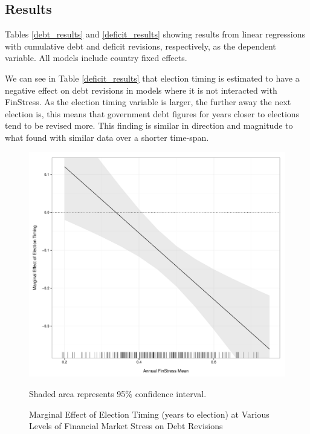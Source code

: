\documentclass[]{article}
\begin{document}




\subsection{Results}

Tables \ref{debt_results} and \ref{deficit_results} showing results from linear regressions with cumulative debt and deficit revisions, respectively, as the dependent variable. All models include country fixed effects.

We can see in Table \ref{deficit_results} that election timing is estimated to have a negative effect on debt revisions in models where it is not interacted with FinStress. As the election timing variable is larger, the further away the next election is, this means that government debt figures for years closer to elections tend to be revised more. This finding is similar in direction and magnitude to what \cite{DeCastro2013} found with similar data over a shorter time-span.

\begin{figure}
    \caption{Marginal Effect of Election Timing (years to election) at Various Levels of Financial Market Stress on Debt Revisions}
    \label{me_finstress_elect}

    \begin{center}
        \includegraphics[scale=0.4]{figures/finstress_elect_me.pdf}
    \end{center}

	{\scriptsize{Shaded area represents 95\% confidence interval.}}

\end{figure}
\end{document}
